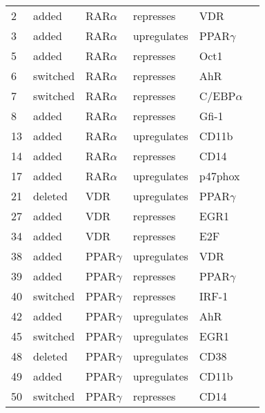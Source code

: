 

\begin{center}
\renewcommand{\arraystretch}{0.8}
\label{WTHL60_Model}
\begin{scriptsize}
\begin{supertabular}{|p{2 cm}|p{2cm}|p{3cm}|p{2.5cm}|p{2cm}|p{1.5cm}|}  
\hline

2 &  added &  RAR$\alpha$  & represses & VDR & \\
3 &  added &  RAR$\alpha$  & upregulates &  PPAR$\gamma$ & \\
5 &  added &  RAR$\alpha$  & represses & Oct1 & \\
6 &  switched &  RAR$\alpha$  & represses & AhR & \\
7 &  switched &  RAR$\alpha$  & represses &C/EBP$\alpha$ & \\
8 &  added &  RAR$\alpha$  & represses & Gfi-1 & \\
13 &  added &  RAR$\alpha$  & upregulates &  CD11b & \\
14 &  added &  RAR$\alpha$  & represses & CD14 & \\
17 &  added &  RAR$\alpha$  & upregulates &  p47phox & \cite{Balmer2002}\\
21 &  deleted &  VDR  & upregulates &  PPAR$\gamma$ & \\
27 &  added &  VDR  & represses & EGR1 & \\
34 &  added &  VDR  & represses & E2F & \\
38 &  added &  PPAR$\gamma$  & upregulates &  VDR & \\
39 &  added &  PPAR$\gamma$  & represses & PPAR$\gamma$ & \\
40 &  switched &  PPAR$\gamma$  & represses & IRF-1 & \\
42 &  added &  PPAR$\gamma$  & upregulates &  AhR & \\
45 &  switched &  PPAR$\gamma$  & upregulates &  EGR1 & \\
48 &  deleted &  PPAR$\gamma$  & upregulates &  CD38 & \\
49 &  added &  PPAR$\gamma$  & upregulates &  CD11b & \\
50 &  switched &  PPAR$\gamma$  & represses & CD14 & \\

\end{supertabular}
\end{scriptsize}
\end{center}
